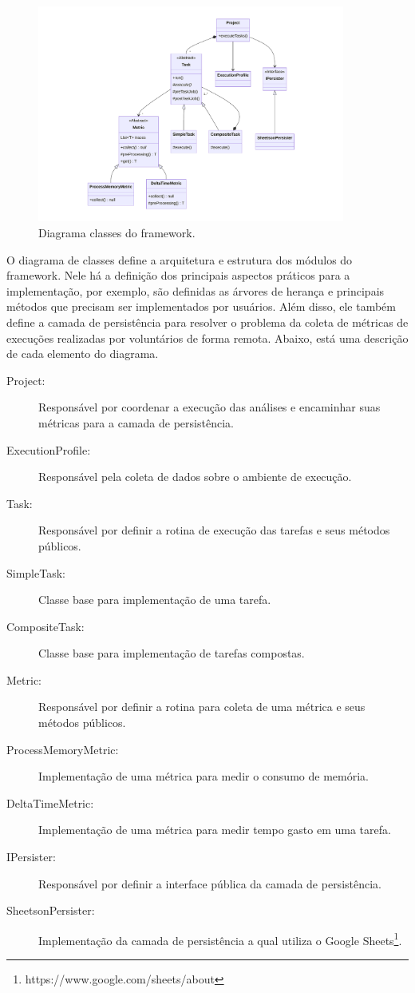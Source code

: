 \documentclass[12pt]{tcc}
\begin{document}
\begin{figure}[!ht]
	\centering
	\includegraphics[width=0.9\textwidth]{figures/diagrama-classes.pdf}
	\caption{Diagrama classes do framework.}
	\label{fig:diag-classes}
\end{figure}

O diagrama de classes define a arquitetura e estrutura dos módulos do framework.
Nele há a definição dos principais aspectos práticos para a implementação, por exemplo, são definidas as árvores de herança e principais métodos que precisam ser implementados por usuários.
Além disso, ele também define a camada de persistência para resolver o problema da coleta de métricas de execuções realizadas por voluntários de forma remota.
Abaixo, está uma descrição de cada elemento do diagrama.

\begin{description}
	\item[Project:] Responsável por coordenar a execução das análises e encaminhar suas métricas para a camada de persistência.
	\item[ExecutionProfile:] Responsável pela coleta de dados sobre o ambiente de execução.
	\item[Task:] Responsável por definir a rotina de execução das tarefas e seus métodos públicos.
	\item[SimpleTask:] Classe base para implementação de uma tarefa.
	\item[CompositeTask:] Classe base para implementação de tarefas compostas.
	\item[Metric:] Responsável por definir a rotina para coleta de uma métrica e seus métodos públicos.
	\item[ProcessMemoryMetric:] Implementação de uma métrica para medir o consumo de memória.
	\item[DeltaTimeMetric:] Implementação de uma métrica para medir tempo gasto em uma tarefa.
	\item[IPersister:] Responsável por definir a interface pública da camada de persistência.
	\item[SheetsonPersister:] Implementação da camada de persistência a qual utiliza o Google Sheets\footnote{https://www.google.com/sheets/about}.
\end{description}
\end{document}
